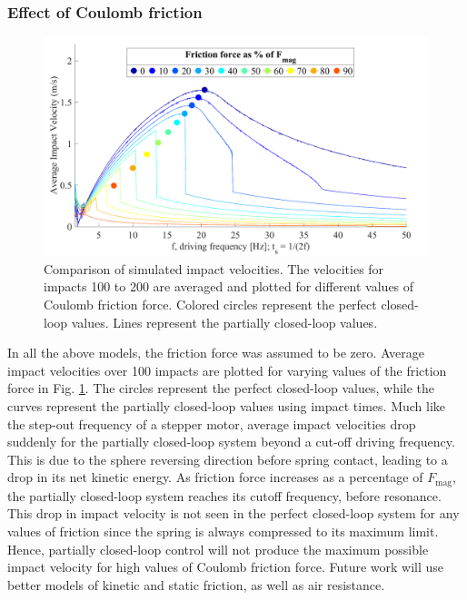 \documentclass[letterpaper, 10 pt, conference]{ieeeconf}  %
\begin{document}
\subsubsection{Effect of Coulomb friction}
\label{frictionwriteup}
\begin{figure}
	\includegraphics[width=\linewidth]{FrictionForceWithClosedLoopValues.pdf}
		\caption[Effect of Coulomb friction on partially closed-loop control]{Comparison of  simulated impact velocities. The  velocities for impacts 100 to 200 are averaged and plotted for different values of Coulomb friction force. Colored circles represent the perfect closed-loop values.  Lines represent the partially closed-loop values.}
	\label{friction}
	\vspace{-2em}
\end{figure}
In all the above models, the friction force was assumed to be zero. Average impact velocities over 100 impacts are plotted for varying values of the friction force in Fig. \ref{friction}. The circles represent the perfect closed-loop values, while the curves represent the partially closed-loop values using impact times. Much like the step-out frequency of a stepper motor, average impact velocities drop suddenly for the partially closed-loop system beyond a cut-off driving frequency. This is due to the sphere reversing direction before spring contact, leading to a drop in its net kinetic energy. As friction force increases as a percentage of $F_{\textrm{mag}}$, the partially closed-loop system reaches its cutoff frequency, before resonance. This drop in impact velocity is not seen in the perfect closed-loop system for any values of friction since the spring is always compressed to its maximum limit. Hence, partially closed-loop control will not produce the maximum possible impact velocity for high values of Coulomb friction force. Future work will use better models of kinetic and static friction, as well as air resistance.
\end{document}

